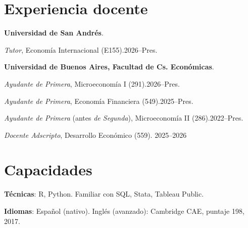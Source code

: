 \documentclass[11pt]{article}
\newcommand{\entrydate}[1]{\hfill{\small{#1}}}
\begin{document}
\section{Experiencia docente}
\textbf{Universidad de San Andrés}.
\begin{cvitems}
  \item \textit{Tutor}, Economía Internacional (E155).\entrydate{2026--Pres.}
\end{cvitems}

\textbf{Universidad de Buenos Aires, Facultad de Cs. Económicas}.
\begin{cvitems}
  \item \textit{Ayudante de Primera}, Microeconomía I (291).\entrydate{2026--Pres.}
  \item \textit{Ayudante de Primera}, Economía Financiera (549).\entrydate{2025--Pres.}
  \item \textit{Ayudante de Primera} (antes \textit{de Segunda}), Microeconomía II (286).\entrydate{2022--Pres.}
  \item \textit{Docente Adscripto}, Desarrollo Económico (559). \entrydate{2025--2026}
  \end{cvitems}

\section{Capacidades}
\textbf{Técnicas}: R, Python. 
Familiar con SQL, Stata, Tableau Public.

\smallskip
\textbf{Idiomas}: Español (nativo). Inglés (avanzado): Cambridge CAE, puntaje 198, 2017.


\end{document}
